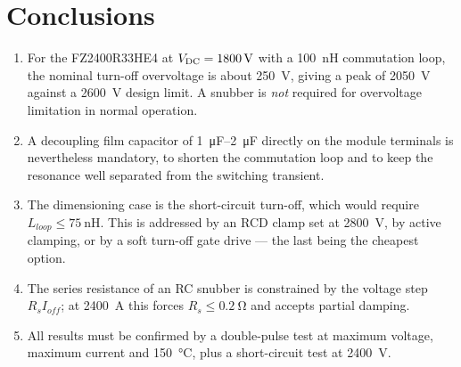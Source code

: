 \section{Conclusions}

\begin{enumerate}[nosep]
\item For the FZ2400R33HE4 at $V_{\mathrm{DC}} = \SI{1800}{\volt}$ with a
      \SI{100}{\nano\henry} commutation loop, the nominal turn-off overvoltage
      is about \SI{250}{\volt}, giving a peak of \SI{2050}{\volt} against a
      \SI{2600}{\volt} design limit. A snubber is \emph{not} required for
      overvoltage limitation in normal operation.
\item A decoupling film capacitor of \SIrange{1}{2}{\micro\farad} directly on
      the module terminals is nevertheless mandatory, to shorten the
      commutation loop and to keep the resonance well separated from the
      switching transient.
\item The dimensioning case is the short-circuit turn-off, which would require
      $L_{loop} \le \SI{75}{\nano\henry}$. This is addressed by an RCD clamp
      set at \SI{2800}{\volt}, by active clamping, or by a soft turn-off gate
      drive --- the last being the cheapest option.
\item The series resistance of an RC snubber is constrained by the voltage
      step $R_s I_{off}$; at \SI{2400}{\ampere} this forces
      $R_s \le \SI{0.2}{\ohm}$ and accepts partial damping.
\item All results must be confirmed by a double-pulse test at maximum voltage,
      maximum current and \SI{150}{\celsius}, plus a short-circuit test at
      \SI{2400}{\volt}.
\end{enumerate}


